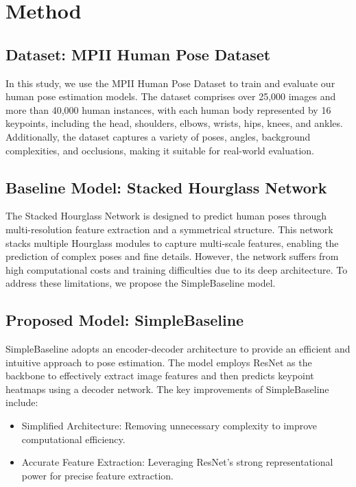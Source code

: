 \documentclass{article}
\begin{document}
\section{Method}
\label{others}

\subsection{Dataset: MPII Human Pose Dataset}

In this study, we use the MPII Human Pose Dataset to train and evaluate our human pose estimation models. The dataset comprises over 25,000 images and more than 40,000 human instances, with each human body represented by 16 keypoints, including the head, shoulders, elbows, wrists, hips, knees, and ankles. Additionally, the dataset captures a variety of poses, angles, background complexities, and occlusions, making it suitable for real-world evaluation.

\subsection{Baseline Model: Stacked Hourglass Network}

The Stacked Hourglass Network is designed to predict human poses through multi-resolution feature extraction and a symmetrical structure. This network stacks multiple Hourglass modules to capture multi-scale features, enabling the prediction of complex poses and fine details. However, the network suffers from high computational costs and training difficulties due to its deep architecture. To address these limitations, we propose the SimpleBaseline model.

\subsection{Proposed Model: SimpleBaseline}

SimpleBaseline adopts an encoder-decoder architecture to provide an efficient and intuitive approach to pose estimation. The model employs ResNet as the backbone to effectively extract image features and then predicts keypoint heatmaps using a decoder network. 
The key improvements of SimpleBaseline include:

\begin{itemize}
\item Simplified Architecture: Removing unnecessary complexity to improve computational efficiency.
\item Accurate Feature Extraction: Leveraging ResNet’s strong representational power for precise feature extraction.
\end{itemize}
\end{document}
